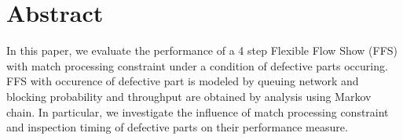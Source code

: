 
\chapter*{Abstract}


In this paper, we evaluate the performance of a 4 step Flexible Flow Show (FFS) with match processing constraint under a condition of defective parts occuring.
FFS with occurence of defective part is modeled by queuing network and blocking probability and throughput are obtained by analysis using Markov chain.
In particular, we investigate the influence of match processing constraint and inspection timing of defective parts on their performance measure.